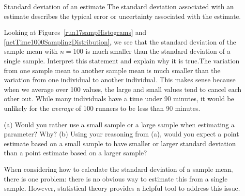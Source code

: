 \begin{onebox}{Standard deviation of an estimate}
The standard deviation associated with an estimate describes the typical error or uncertainty associated with the estimate.\end{onebox}

\begin{examplewrap}
\begin{nexample}{Looking at Figures~\ref{run17sampHistograms} and \ref{netTime1000SamplingDistribution}, we see that the standard deviation of the sample mean with $n=100$ is much smaller than the standard deviation of a single sample. Interpret this statement and explain why it is true.}The variation from one sample mean to another sample mean is much smaller than the variation from one individual to another individual. This makes sense because when we average over 100 values, the large and small values tend to cancel each other out. While many individuals have a time under 90 minutes, it would be unlikely for the \emph{average} of 100 runners to be less than 90 minutes.
\end{nexample}
\end{examplewrap}

\D{\newpage}

\begin{exercisewrap}
\begin{nexercise}
(a) Would you rather use a small sample or a large sample when estimating a parameter? Why? (b) Using your reasoning from (a), would you expect a point estimate based on a small sample to have smaller or larger standard deviation than a point estimate based on a larger sample?\footnotemark
\end{nexercise}
\end{exercisewrap}

When considering how to calculate the standard deviation of a sample mean, there is one problem: there is no obvious way to estimate this from a single sample. However, statistical theory provides a helpful tool to address this issue.

